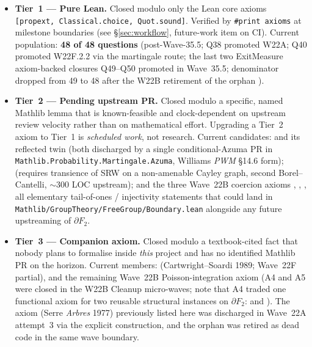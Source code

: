 \documentclass[11pt,a4paper]{article}
\newcommand{\cmd}[1]{\texttt{\small #1}}
\newcommand{\lmod}[1]{\texttt{\small #1}}
\theoremstyle{plain}
\theoremstyle{definition}
\begin{document}
\begin{itemize}[leftmargin=1.3em]
  \item \textbf{Tier~1 --- Pure Lean.} Closed modulo only the Lean
        core axioms \cmd{[propext, Classical.choice, Quot.sound]}.
        Verified by \cmd{\#print axioms} at milestone boundaries
        (see \S\ref{sec:workflow}, future-work item on CI). Current
        population: \textbf{48 of 48 questions} (post-Wave-35.5;
        Q38 promoted W22A; Q40 promoted W22F.2.2 via the martingale
        route; the last two ExitMeasure axiom-backed closures
        Q49--Q50 promoted in Wave~35.5; denominator dropped from
        49 to 48 after the W22B retirement of the orphan
        ).
  \item \textbf{Tier~2 --- Pending upstream PR.} Closed modulo a
        specific, named Mathlib lemma that is known-feasible and
        clock-dependent on upstream review velocity rather than on
        mathematical effort. Upgrading a Tier~2 axiom to Tier~1 is
        \emph{scheduled work}, not research. Current candidates:
         and its reflected twin
         (both discharged by a
        single conditional-Azuma PR in
        \cmd{Mathlib.Probability.Martingale.Azuma}, Williams \emph{PWM}
        \S14.6 form);  (requires
        transience of SRW on a non-amenable Cayley graph, second
        Borel--Cantelli, $\sim$300 LOC upstream); and the three
        Wave~22B coercion axioms
        ,
        ,
        , all elementary
        tail-of-ones / injectivity statements that could land in
        \lmod{Mathlib/GroupTheory/FreeGroup/Boundary.lean} alongside
        any future upstreaming of $\partial F_2$.
  \item \textbf{Tier~3 --- Companion axiom.} Closed modulo a
        textbook-cited fact that nobody plans to formalise inside
        \emph{this} project and has no identified Mathlib PR on the
        horizon. Current members: 
        (Cartwright--Soardi 1989; Wave~22F partial),
        and the remaining Wave~22B Poisson-integration axiom
         (A4 and A5
        were closed in the W22B Cleanup micro-waves; note that
        A4 traded one functional axiom for two reusable structural
        instances on $\partial F_2$: 
        and ). The
         axiom (Serre \emph{Arbres}
        1977) previously listed here was discharged in Wave~22A
        attempt~3 via the explicit  construction, and
        the  orphan was retired
        as dead code in the same wave boundary.
\end{itemize}
\end{document}
